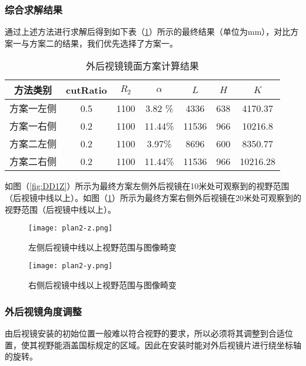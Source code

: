 \documentclass[withoutpreface,bwprint]{cumcmthesis} %
\begin{document}
\subsubsection{综合求解结果}
通过上述方法进行求解后得到如下表（\ref{计算结果1}）所示的最终结果（单位为mm），对比方案一与方案二的结果，我们优先选择了方案一。
\begin{table}[!htbp]
\centering
\caption{外后视镜镜面方案计算结果}
\label{计算结果1}
\begin{tabular}{ccccccc}
\toprule
方法类别 & cutRatio & $R_2$ & $\alpha$ & $L$ & $H$ & $K$\\ \midrule

方案一左侧 &0.5 &    1100   &     3.82      \%    &4336  &   638 &  4170.37 \\
方案一右侧 & 0.2 &   1100    &     11.44\%   &11536       &966  &10216.8    \\
方案二左侧 &0.2 &    1100     &    3.97\% & 8696 & 600   & 8350.77\\                                                  
方案二右侧 & 0.2    & 1100      &   11.44\%           & 11536   & 966   & 10216.28  \\       
\bottomrule 
\end{tabular}
\end{table}

\par 如图（\ref{fig:DD1Z}）所示为最终方案左侧外后视镜在10米处可观察到的视野范围（后视镜中线以上）。如图（\ref{fig:DD1Y}）所示为最终方案右侧外后视镜在20米处可观察到的视野范围（后视镜中线以上）。


\begin{figure}[!htbp]  
\begin{minipage}[t]{0.5\textwidth}
\centering  
\texttt{[image: plan2-z.png]}
\caption{左侧后视镜中线以上视野范围与图像畸变} \label{fig:DD1Z}\end{minipage}
\hspace{1ex}
\begin{minipage}[t]{0.5\textwidth}  
\centering  
\texttt{[image: plan2-y.png]}
\caption{右侧后视镜中线以上视野范围与图像畸变} \label{fig:DD1Y}\end{minipage}  
\end{figure} 

 
\subsubsection{外后视镜角度调整}
\par 由后视镜安装的初始位置一般难以符合视野的要求，所以必须将其调整到合适位置，使其视野能涵盖国标规定的区域。因此在安装时能对外后视镜片进行绕坐标轴的旋转。
\end{document}
